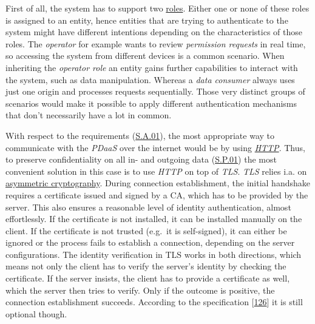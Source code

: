 \documentclass[12pt,english,a4paper,titlepage,cleardoublepage=empty,dottedtoc]{report}
\begin{document}
First of all, the system has to support two
\protect\hyperlink{sa03}{roles}. Either one or none of these roles is
assigned to an entity, hence entities that are trying to authenticate to
the system might have different intentions depending on the
characteristics of those roles. The \emph{operator} for example wants to
review \emph{permission requests} in real time, so accessing the system
from different devices is a common scenario. When inheriting the
\emph{operator role} an entity gains further capabilities to interact
with the system, such as data manipulation. Whereas a \emph{data
consumer} always uses just one origin and processes requests
sequentially. Those very distinct groups of scenarios would make it
possible to apply different authentication mechanisms that don't
necessarily have a lot in common.

With respect to the requirements (\protect\hyperlink{sa01}{S.A.01}), the
most appropriate way to communicate with the \emph{PDaaS} over the
internet would be by using \emph{\protect\hyperlink{def--http}{HTTP}}.
Thus, to preserve confidentiality on all in- and outgoing data
(\protect\hyperlink{sp01}{S.P.01}) the most convenient solution in this
case is to use \emph{HTTP} on top of \emph{TLS}. \emph{TLS} relies i.a.
on \protect\hyperlink{def--asym-crypto}{asymmetric cryptography}. During
connection establishment, the initial handshake requires a certificate
issued and signed by a CA, which has to be provided by the server. This
also ensures a reasonable level of identity authentication, almost
effortlessly. If the certificate is not installed, it can be installed
manually on the client. If the certificate is not trusted (e.g.~it is
self-signed), it can either be ignored or the process fails to establish
a connection, depending on the server configurations. The identity
verification in TLS works in both directions, which means not only the
client has to verify the server's identity by checking the certificate.
If the server insists, the client has to provide a certificate as well,
which the server then tries to verify. Only if the outcome is positive,
the connection establishment succeeds. According to the specification
{[}\protect\hyperlink{ref-web_spec_tls-12_client-auth}{126}{]} it is
still optional though.
\end{document}
